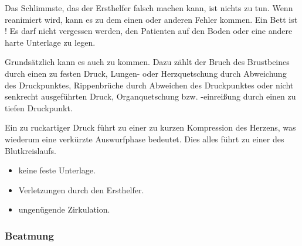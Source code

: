 {
Das Schlimmste, das der Ersthelfer falsch machen kann, ist
 nichts zu tun. Wenn reanimiert wird, kann es zu dem
 einen oder anderen Fehler kommen. Ein Bett ist ! Es darf nicht vergessen werden, den
 Patienten auf den Boden oder eine andere harte Unterlage zu
 legen.

Grundsätzlich
kann es auch zu  kommen. Dazu zählt der
Bruch des Brustbeines durch einen zu festen Druck, Lungen- oder Herzquetschung
durch Abweichung des Druckpunktes, Rippenbrüche durch Abweichen des
Druckpunktes oder nicht senkrecht ausgeführten Druck, Organquetschung bzw.
-einreißung durch einen zu tiefen Druckpunkt.  

Ein zu ruckartiger Druck führt zu einer zu kurzen Kompression des Herzens, was
wiederum eine verkürzte Auswurfphase bedeutet. Dies alles führt zu einer
 des Blutkreislaufs. 

}{
\begin{itemize}
  \item keine feste Unterlage.
  \item Verletzungen durch den Ersthelfer.
  \item ungenügende Zirkulation.
\end{itemize}
}{}{}{}

\subsubsection{Beatmung}

